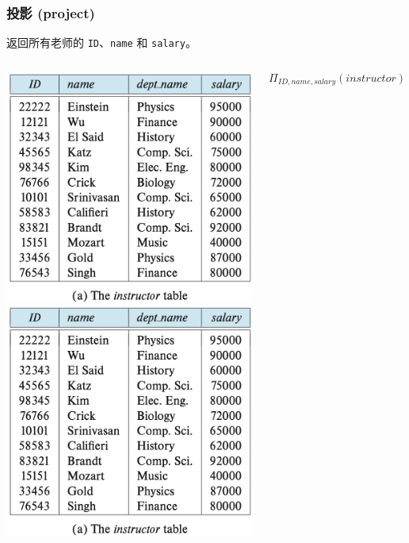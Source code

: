 \documentclass[aspectratio=169, 14pt]{beamer}
\begin{document}
\begin{frame}
    \frametitle{投影 (project)}
    返回所有老师的 \texttt{ID}、\texttt{name} 和 \texttt{salary}。
    \begin{columns}
        \includegraphics[width=\textwidth, trim={0 4.4cm 0 0},clip]{table/instructor}
        \includegraphics[height=.4\paperheight, trim={2.8cm 4.4cm 0 0},clip]{table/instructor}
        \pause
        \large{\[\Pi_{ID, name, salary}(instructor)\]}
    \end{columns}
\end{frame}
\end{document}
